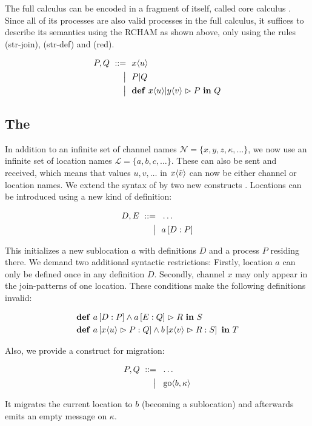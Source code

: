 The full calculus can be encoded in a fragment of itself, called core calculus
\cite{fournet_reflexive_1996}.
Since all of its processes are also valid processes in the full calculus,
it suffices to describe its semantics using the RCHAM as shown above,
only using the rules (str-join), (str-def) and (red).

\begin{align*}
  P, Q
  \ ::=&\ \  x\langle u\rangle
  \\ \big|&\ \  P | Q
  \\ \big|&\ \  \textbf{\textup{def}} \ x\langle u\rangle | y\langle v\rangle \vartriangleright P \ \textbf{\textup{in}} \ Q
\end{align*}


\subsection{The \DistJoinCalc}

In addition to an infinite set of channel names
$ \mathcal{N} = \{ x, y, z, \kappa, \ldots \} $,
we now use an infinite set of location names
$ \mathcal{L} = \{ a, b, c, \ldots \} $.
These can also be sent and received, which means that values
$ u, v, \ldots $ in $ x\langle\tilde{v}\rangle $
can now be either channel or location names.
We extend the syntax of \joincalc by two new constructs
\cite{fournet_calculus_1996}.
Locations can be introduced using a new kind of definition:

\begin{align*}
  D, E
  \ ::=&\ \  \dots
  \\ \big|&\ \  a \left[ D : P \right]
\end{align*}

This initializes a new sublocation $a$ with definitions $D$
and a process $P$ residing there.
We demand two additional syntactic restrictions:
Firstly, location $a$ can only be defined once in any definition $D$.
Secondly, channel $x$ may only appear in the join-patterns of one location.
These conditions make the following definitions invalid:

\begin{align*}
  &\textbf{\textup{def}} \ a \left[ D : P \right] \wedge a \left[ E : Q \right] \vartriangleright R \ \textbf{\textup{in}} \ S
  \\
  &\textbf{\textup{def}} \ a \left[ x\langle u\rangle \vartriangleright P : Q \right]
     \wedge
     b \left[ x\langle v\rangle \vartriangleright R : S \right]
      \ \textbf{\textup{in}} \ T
\end{align*}

Also, we provide a construct for migration:

\begin{align*}
  P, Q
  \ ::=&\ \  \dots
  \\ \big|&\ \  \operatorname{go} \langle b, \kappa \rangle
\end{align*}

It migrates the current location to $b$ (becoming a sublocation)
and afterwards emits an empty message on $\kappa$.


